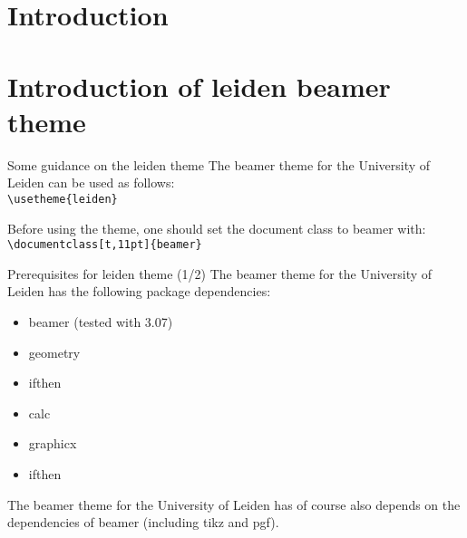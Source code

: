 \documentclass[t,11pt]{beamer}
\subtitle{Template to generate Leiden-style slides with LaTeX}
\date{December 9th, 2010}
\title{\insertlecture}
\author{dr.~Joost Schalken}
\institute{Universiteit Leiden}
\begin{document}
\nonstopmode %


\section*{Introduction}

{
\begin{frame}[plain]
  \maketitle
\end{frame}
\addtocounter{framenumber}{-1}%
}


\section{Introduction of leiden beamer theme}

\begin{frame}[fragile]{Some guidance on the leiden theme}
The beamer theme for the University of Leiden can be used as follows:\\
\verb|\usetheme{leiden}|\\
\vspace{\baselineskip}

Before using the theme, one should set the document class to beamer
with:\\
\verb|\documentclass[t,11pt]{beamer}|
\end{frame}

\begin{frame}[fragile]{Prerequisites for leiden theme (1/2)}
The beamer theme for the University of Leiden has the following
package dependencies:
\begin{itemize}
\item	beamer (tested with 3.07)
\item	geometry
\item	ifthen
\item	calc
\item	graphicx
\item	ifthen
\end{itemize}
\vspace{\baselineskip}

The beamer theme for the University of Leiden has of course also
depends on the dependencies of beamer (including tikz and pgf).
\end{frame}
\end{document}
